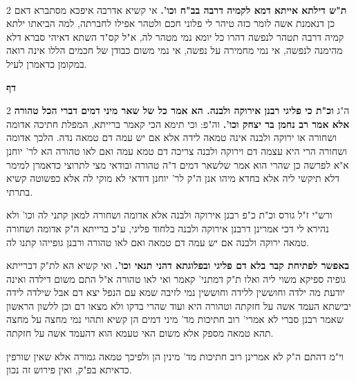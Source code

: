 \documentclass[12pt, openany]{book}
\newcommand{\sethebfont}{
\fontsize{10.5pt}{21.0pt} \selectfont
}
\newcommand{\twocol}[1]{
	{\sethebfont \begin{multicols}{2}
			#1
	\end{multicols}}	
}
\newcommand{\textblock}[1]{
{\sethebfont #1\\}	
}
\newcommand{\chapname}{}
\newcommand{\newchap}[1]{
	\addcontentsline{toc}{chapter}{#1}
	\renewcommand{\chapname}{#1}
		\begin{center}
			\textbf{%
\fontsize{16pt}{16pt}\selectfont
				#1}
		\end{center}
}
\begin{document}
\textblock{}{}
\twocol{\textbf{ת"ש דילתא אייתא דמא לקמיה דרבה בב"ח וכו'.}  אי קשיא אדרבה איפכא מסתברא דאם כן דנאמנת אשה לומר כזה טיהר לי פלוני חכם ולטהר אפילו לחברתה, למה הביאתו ילתא קמיה דרבה תטהר לנפשה דהרו כל יומא נמי מטהר לה, א"ל קס"ד השתא דאיהי סברא דלא מהימנה לנפשה, אי נמי מחמירה על נפשה, אי נמי משום כבודן של חכמים הללו אינה רואה במקומן כדאמרן לעיל. 
\par}
\newchap{דף }
\twocol{ה"ג \textbf{וכ"ת כי פליגי רבנן אירוקה ולבנה. הא אמר כל של שאר מיני דמים דברי הכל טהורה אלא אמר רב נחמן בר יצחק וכו'.}  וה"פ: וכי תימא הכי קאמר ברייתא, המפלת חתיכה אדומה ושחורה או ירוקה ולבנה אינה טמאה לידה אלא אם יש עמה דם טמאה נדה. הלכך אדומה ושחורה הרי היא עצמה דם וירוקה ולבנה צריכה דם טמא עמה ואם לאו טהורה הא לר' יוחנן א"א לפרשה כן שהרי הוא אמר שלשאר דמים ד"ה טהורה ובודאי מצי לתרוצי כדאמרן למימר דלא תיקשי ליה אלא בחדא מיהו אנן ה"ק לר' יוחנן דודאי לא מוקי לה אלא כפשוטה קשיא בתרתי.\par  ורש"י ז"ל גורס וכ"ת כ"פ רבנן אירוקה ולבנה אלא אדומה ושחורה למאן קתני לה וכו' ולא נהירא לי דכי אמרינן דרבנן אירוקה ולבנה בלחוד פליגי, ע"כ ברייתא ה"ק אדומה ושחורה טמאה ירוקה ולבנה אם יש עמה דם טמאה ואם לאו טהורה ורבנן גופייהו קתנו לה. 
\par\textbf{באפשר לפתיחת קבר בלא דם פליגי ובפלוגתא דהני תנאי וכו'.}  ואי קשיא הא לת"ק דברייתא גופיה ספיקא משוי ליה ואלו ת"ק דמתני' קאמר ואי לאו טהורה א"ל התם משום דילדה ואינה יודעת מה ילדה וחוששין ללידה וחוששין נמי לזיבה שמא עם הנפל יצא דם אבל שילדה לידה יבישתא העמד אשה על חזקתה וטהורה היא ועוד שהרי בדקו ולא מצאו דם וכן ללשון הראשון שאמר רבנן סברי לא אמרי' רוב חתיכות מד' מיני דמים הן קשיא ותהוי נמי מחצה על מחצה תהא טמאה מספק אלא משום האי טעמא הוא דהעמד אשה על חזקתה.\par וי"מ דהתם ה"ק לא אמרינן רוב חתיכות מד' מינין הן ולפיכך טמאה גמורה אלא שאין שורפין כדאיתא בפ"ק, ואין פירוש זה נכון. 
\par}
\end{document}
